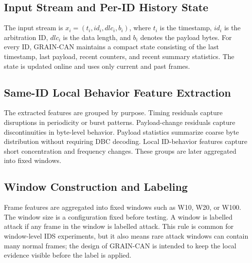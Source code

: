 \documentclass[runningheads]{llncs}
\newcommand{\method}{GRAIN-CAN}
\begin{document}
\subsection{Input Stream and Per-ID History State}
The input stream is \(x_i=(t_i,id_i,dlc_i,b_i)\), where \(t_i\) is the timestamp, \(id_i\) is the arbitration ID, \(dlc_i\) is the data length, and \(b_i\) denotes the payload bytes. For every ID, \method{} maintains a compact state consisting of the last timestamp, last payload, recent counters, and recent summary statistics. The state is updated online and uses only current and past frames.

\subsection{Same-ID Local Behavior Feature Extraction}
The extracted features are grouped by purpose. Timing residuals capture disruptions in periodicity or burst patterns. Payload-change residuals capture discontinuities in byte-level behavior. Payload statistics summarize coarse byte distribution without requiring DBC decoding. Local ID-behavior features capture short concentration and frequency changes. These groups are later aggregated into fixed windows.

\subsection{Window Construction and Labeling}
Frame features are aggregated into fixed windows such as W10, W20, or W100. The window size is a configuration fixed before testing. A window is labelled attack if any frame in the window is labelled attack. This rule is common for window-level IDS experiments, but it also means rare attack windows can contain many normal frames; the design of \method{} is intended to keep the local evidence visible before the label is applied.
\end{document}
